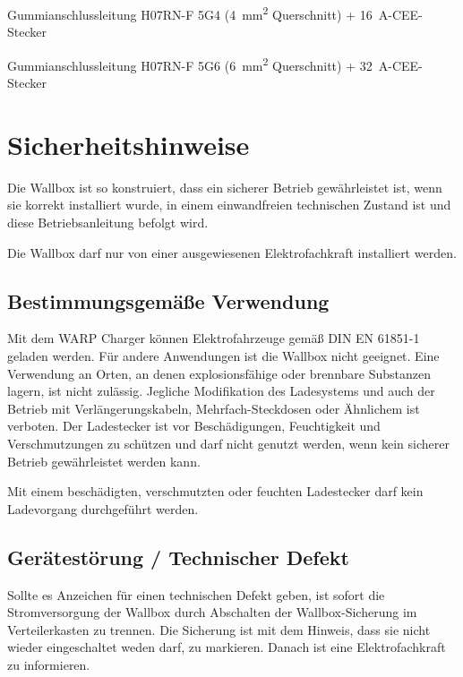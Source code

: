 \documentclass[a4paper,10pt]{article}
\newcommand{\hint}[1]{\begin{tcolorbox}[colback=boxgray,colframe=black,coltext=
white,title=Hinweis,left*=2mm,right*=2mm,boxsep=1mm,bottom=1mm,top=1mm]#1\end{tcolorbox}}
\begin{document}
\begin{multicols*}{2}
	\begin{description}[leftmargin=!,labelwidth=\widthof{\textbf{\SI{22}{\kilo\watt}}}]
		\item[\SI{11}{\kilo\watt}]Gummianschlussleitung H07RN-F 5G4
		      (\SI{4}{\square\milli\meter}
		      Querschnitt) + \SI{16}{\ampere}-CEE-Stecker
		\item[\SI{22}{\kilo\watt}]Gummianschlussleitung H07RN-F 5G6
		      (\SI{6}{\square\milli\meter}
		      Querschnitt) + \SI{32}{\ampere}-CEE-Stecker
	\end{description}

	\newpage
	\section{Sicherheitshinweise}
	Die Wallbox ist so konstruiert, dass ein sicherer Betrieb gewährleistet ist,
	wenn sie korrekt installiert wurde, in einem einwandfreien technischen Zustand
	ist und diese Betriebsanleitung befolgt wird. \hint{Die Wallbox darf nur von einer ausgewiesenen Elektrofachkraft installiert
		werden.}

	\subsection{Bestimmungsgemäße Verwendung}
	Mit dem WARP Charger können Elektrofahrzeuge gemäß DIN EN 61851-1 geladen
	werden. Für andere Anwendungen ist die Wallbox nicht geeignet. Eine Verwendung
	an Orten, an denen explosionsfähige oder brennbare Substanzen lagern, ist nicht
	zulässig. Jegliche Modifikation des Ladesystems und auch der Betrieb mit
	Verlängerungskabeln, Mehrfach-Steckdosen oder Ähnlichem ist verboten. Der
	Ladestecker ist vor Beschädigungen, Feuchtigkeit und Verschmutzungen zu
	schützen und darf nicht genutzt werden, wenn kein sicherer Betrieb
	gewährleistet werden kann. \hint{Mit einem beschädigten, verschmutzten oder feuchten Ladestecker darf kein Ladevorgang durchgeführt
		werden.}

	\subsection{Gerätestörung / Technischer Defekt}
	Sollte es Anzeichen für einen technischen Defekt geben, ist sofort die
	Stromversorgung der Wallbox durch Abschalten der Wallbox-Sicherung im Verteilerkasten zu trennen.
	Die Sicherung ist mit dem Hinweis, dass sie nicht wieder eingeschaltet weden darf, zu markieren.
	Danach ist eine Elektrofachkraft zu informieren.


\end{multicols*}
\end{document}
